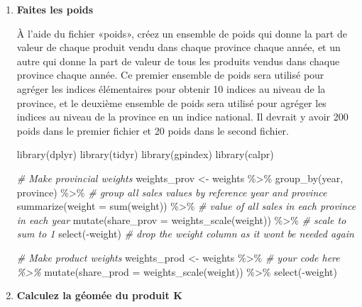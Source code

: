 \documentclass[
]{article}
\newenvironment{Shaded}{\begin{snugshade}}{\end{snugshade}}
\newcommand{\AttributeTok}[1]{\textcolor[rgb]{0.77,0.63,0.00}{#1}}
\newcommand{\CommentTok}[1]{\textcolor[rgb]{0.56,0.35,0.01}{\textit{#1}}}
\newcommand{\FunctionTok}[1]{\textcolor[rgb]{0.00,0.00,0.00}{#1}}
\newcommand{\NormalTok}[1]{#1}
\newcommand{\OtherTok}[1]{\textcolor[rgb]{0.56,0.35,0.01}{#1}}
\newcommand{\SpecialCharTok}[1]{\textcolor[rgb]{0.00,0.00,0.00}{#1}}
\begin{document}
\begin{enumerate}
\def\labelenumi{\arabic{enumi}.}
\item
  \textbf{Faites les poids}

  À l'aide du fichier «poids», créez un ensemble de poids qui donne la part de valeur de chaque produit vendu dans chaque province chaque année, et un autre qui donne la part de valeur de tous les produits vendus dans chaque province chaque année. Ce premier ensemble de poids sera utilisé pour agréger les indices élémentaires pour obtenir 10 indices au niveau de la province, et le deuxième ensemble de poids sera utilisé pour agréger les indices au niveau de la province en un indice national. Il devrait y avoir 200 poids dans le premier fichier et 20 poids dans le second fichier.

\begin{Shaded}
\begin{Highlighting}[]
\FunctionTok{library}\NormalTok{(dplyr)}
\FunctionTok{library}\NormalTok{(tidyr)}
\FunctionTok{library}\NormalTok{(gpindex)}
\FunctionTok{library}\NormalTok{(calpr)}

\CommentTok{\# Make provincial weights}
\NormalTok{weights\_prov }\OtherTok{\textless{}{-}}\NormalTok{ weights }\SpecialCharTok{\%\textgreater{}\%}
  \FunctionTok{group\_by}\NormalTok{(year, province) }\SpecialCharTok{\%\textgreater{}\%} \CommentTok{\# group all sales values by reference year and province}
  \FunctionTok{summarize}\NormalTok{(}\AttributeTok{weight =} \FunctionTok{sum}\NormalTok{(weight)) }\SpecialCharTok{\%\textgreater{}\%} \CommentTok{\# value of all sales in each province in each year}
  \FunctionTok{mutate}\NormalTok{(}\AttributeTok{share\_prov =} \FunctionTok{weights\_scale}\NormalTok{(weight)) }\SpecialCharTok{\%\textgreater{}\%} \CommentTok{\# scale to sum to 1}
  \FunctionTok{select}\NormalTok{(}\SpecialCharTok{{-}}\NormalTok{weight) }\CommentTok{\# drop the weight column as it won\textquotesingle{}t be needed again}

\CommentTok{\# Make product weights}
\NormalTok{weights\_prod }\OtherTok{\textless{}{-}}\NormalTok{ weights }\SpecialCharTok{\%\textgreater{}\%}
  \CommentTok{\# your code here \%\textgreater{}\%}
  \FunctionTok{mutate}\NormalTok{(}\AttributeTok{share\_prod =} \FunctionTok{weights\_scale}\NormalTok{(weight)) }\SpecialCharTok{\%\textgreater{}\%}
  \FunctionTok{select}\NormalTok{(}\SpecialCharTok{{-}}\NormalTok{weight)}
\end{Highlighting}
\end{Shaded}
\item
  \textbf{Calculez la géomée du produit K}


\end{enumerate}
\end{document}
